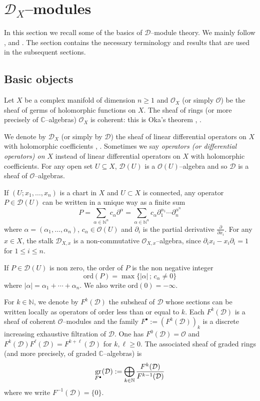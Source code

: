 \documentclass[12pt]{article}
\newcommand{\CC}{\mathbb{C}}
\newcommand{\NN}{\mathbb{N}}
\DeclareMathOperator{\gr}{\rm gr}
\newcommand{\OO}{\mathcal{O}}
\newcommand{\DD}{\mathcal{D}}
\newcommand{\ord}{{\mathrm{ord}}}
\newcommand{\cO}{\OO}
\begin{document}
\section{$\DD_X$--modules\index{$\DD$--modules}} \label{D_X-modules} In this section we recall some of the basics of $\DD$--module theory.
We mainly follow \cite{sem-gre-1975}, \cite{meb_formalisme} and \cite{Granger-Maisonobe-cimpa-niza}. The section contains the necessary terminology and results that are used in the subsequent sections.

\subsection{Basic objects} \label{basic-objects} Let $X$ be a complex manifold of dimension $n\geq 1$ and $\cO_X$ (or simply $\cO$) be the sheaf of germs of holomorphic functions on $X$. The sheaf of rings (or more precisely of $\CC$--algebras) $\cO_X$ is coherent: this is Oka's theorem \cite{Oka-Kiyoshi}, \cite{sem-cartan-51-52}.

We denote by $\DD_X$ (or simply by $\DD$) the sheaf of linear differential operators on $X$ with holomorphic coefficients \cite[I, \S 1]{sem-gre-1975}, \cite[Def. 3]{Granger-Maisonobe-cimpa-niza}. Sometimes we say {\em operators (or differential operators) on $X$} instead of linear differential operators on $X$ with holomorphic coefficients. For any open set $U\subseteq X$, $\DD(U)$ is a  $\cO(U)$--algebra and so $\DD$ is a sheaf of $\cO$--algebras.

If $(U; x_1,\ldots,x_n)$ is a chart in $X$ and $U\subset X$ is connected, any operator $P\in \DD(U)$ can be written in a unique way as a finite sum $$P = \sum_{\alpha \in \NN^n} c_\alpha \partial^\alpha =  \sum_{\alpha \in \NN^n} c_\alpha \partial_1^{\alpha_1} \cdots  \partial_n^{\alpha^n}$$ where $\alpha = (\alpha_1,\ldots,\alpha_n)$, $c_\alpha \in \cO(U)$ and $\partial_i$ is the partial derivative $\frac{\partial}{\partial x_i}$. For any $x\in X$, the stalk $\DD_{X,x}$ is a non-commutative $\cO_{X,x}$--algebra, since $\partial_i x_i - x_i \partial_i = 1$ for $1\leq i \leq n$.


If $P\in \DD(U)$ is non zero, the order of $P$ is the non negative integer $$\ord(P)=\max \{|\alpha|\, ;\, c_\alpha \not= 0\}$$ where $|\alpha| = \alpha_1 +\cdots+\alpha_n$. We also write $\ord(0)=-\infty$.

For $k\in \NN$, we denote by $F^k(\DD)$ the subsheaf of $\DD$ whose sections can be written locally as operators of order less than or equal to $k$. Each $F^k(\DD)$ is a sheaf of coherent $\cO$--modules and the family $F^\bullet := (F^k(\DD))_k$ is a discrete increasing exhaustive filtration of $\DD$. One has $F^0(\DD)=\cO$ and $F^k(\DD)F^{\ell}(\DD)=F^{k+\ell}(\DD)$ for $k,\ell\geq 0$. The associated sheaf of graded rings (and more precisely, of graded $\CC$--algebras) is $$\gr_{F^\bullet}(\DD) : = \bigoplus_{k\in \NN} \frac{F^k(\DD)}{F^{k-1}(\DD)}$$ where we write $F^{-1}(\DD)=\{0\}$.
\end{document}
